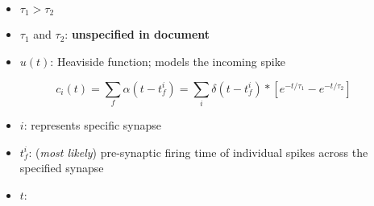 \documentclass{article}
\begin{document}
                \begin{itemize}
                    \item $\tau_1 > \tau_2$
                    \item $\tau_1$ and $\tau_2$: \textbf{unspecified in document}
                    \item $u(t)$: Heaviside function; models the incoming spike
                \end{itemize}
                \hfill\break
                \begin{equation}
                    c_i(t)=\sum_{f}\alpha(t-t^i_f)=\sum_{i}\delta(t-t^i_f)\ast[e^{-t/\tau_1}-e^{-t/\tau_2}]
                \end{equation}
                \begin{itemize}
                    \item $i$: represents specific synapse
                    \item $t^i_f$: (\textit{most likely}) pre-synaptic firing time of
                    individual spikes across the specified synapse
                    \item $t$: 
                \end{itemize}
\end{document}
